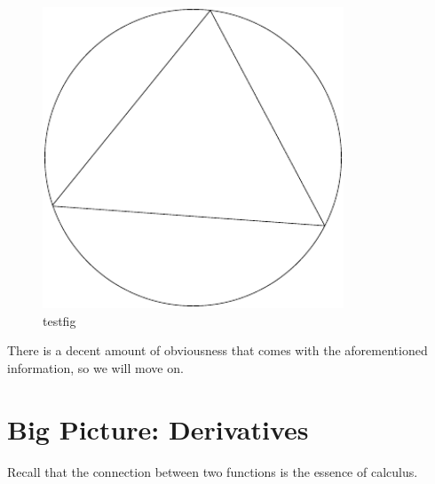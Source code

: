 \documentclass{article}
\begin{document}
\begin{figure}[ht]
    \centering
 \includegraphics[width=0.8\textwidth]{./figures/testfig.pdf}
    \caption{testfig}
    \label{fig:testfig}
\end{figure}

There is a decent amount of obviousness that comes with the aforementioned information, so we will move on. 

\section{Big Picture: Derivatives}

Recall that the connection between two functions is the essence of calculus. 
\end{document}

